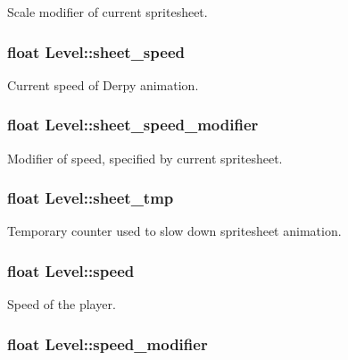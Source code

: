 Scale modifier of current spritesheet. \hypertarget{structLevel_a41db1345ac158898450907010a49748f}{
\subsubsection[{sheet\-\_\-speed}]{\setlength{\rightskip}{0pt plus 5cm}float Level\-::sheet\-\_\-speed}}\label{structLevel_a41db1345ac158898450907010a49748f}
Current speed of Derpy animation. \hypertarget{structLevel_a3cae10fd441bcc14b6a47dd5fedafa59}{
\subsubsection[{sheet\-\_\-speed\-\_\-modifier}]{\setlength{\rightskip}{0pt plus 5cm}float Level\-::sheet\-\_\-speed\-\_\-modifier}}\label{structLevel_a3cae10fd441bcc14b6a47dd5fedafa59}
Modifier of speed, specified by current spritesheet. \hypertarget{structLevel_a22e80ea91fd267dae85c0457e581d072}{
\subsubsection[{sheet\-\_\-tmp}]{\setlength{\rightskip}{0pt plus 5cm}float Level\-::sheet\-\_\-tmp}}\label{structLevel_a22e80ea91fd267dae85c0457e581d072}
Temporary counter used to slow down spritesheet animation. \hypertarget{structLevel_a936a1d131d1e056878474ca831c5e88f}{
\subsubsection[{speed}]{\setlength{\rightskip}{0pt plus 5cm}float Level\-::speed}}\label{structLevel_a936a1d131d1e056878474ca831c5e88f}
Speed of the player. \hypertarget{structLevel_a0f6fa70a2e0b85437dc1973d1409381f}{
\subsubsection[{speed\-\_\-modifier}]{\setlength{\rightskip}{0pt plus 5cm}float Level\-::speed\-\_\-modifier}}\label{structLevel_a0f6fa70a2e0b85437dc1973d1409381f}

